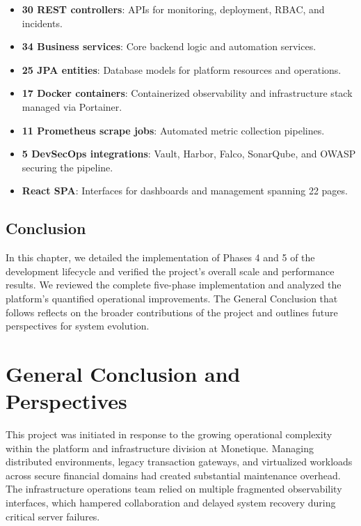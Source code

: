 \documentclass[12pt,a4paper]{report}
\begin{document}
\begin{itemize}
    \item \textbf{30 REST controllers}: APIs for monitoring, deployment, RBAC, and incidents.
    \item \textbf{34 Business services}: Core backend logic and automation services.
    \item \textbf{25 JPA entities}: Database models for platform resources and operations.
    \item \textbf{17 Docker containers}: Containerized observability and infrastructure stack managed via Portainer.
    \item \textbf{11 Prometheus scrape jobs}: Automated metric collection pipelines.
    \item \textbf{5 DevSecOps integrations}: Vault, Harbor, Falco, SonarQube, and OWASP securing the pipeline.
    \item \textbf{React SPA}: Interfaces for dashboards and management spanning 22 pages.
\end{itemize}

\section*{Conclusion}
In this chapter, we detailed the implementation of Phases 4 and 5 of the development lifecycle and verified the project's overall scale and performance results. We reviewed the complete five-phase implementation and analyzed the platform's quantified operational improvements. The General Conclusion that follows reflects on the broader contributions of the project and outlines future perspectives for system evolution.


\newpage

\chapter*{General Conclusion and Perspectives}

This project was initiated in response to the growing operational complexity within the platform and infrastructure division at Monetique. Managing distributed environments, legacy transaction gateways, and virtualized workloads across secure financial domains had created substantial maintenance overhead. The infrastructure operations team relied on multiple fragmented observability interfaces, which hampered collaboration and delayed system recovery during critical server failures. 
\end{document}
